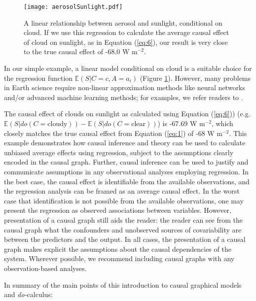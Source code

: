 \documentclass[12pt]{article}
\begin{document}
\begin{figure} \centering \texttt{[image: aerosolSunlight.pdf]}
  \caption{A linear relationship between aerosol and sunlight,
    conditional on cloud. If we use this regression to calculate the
    average causal effect of cloud on sunlight, as in Equation
    (\ref{eq:6}), our result is very close to the true causal effect
    of -68.0 W m$^{-2}$.}
  \label{fig:linear}
\end{figure}

In our simple example, a linear model conditional on cloud is a
suitable choice for the regression function
$\mathbb{E}(S | C=c, A=a_i)$ (Figure \ref{fig:linear}). However, many
problems in Earth science require non-linear approximation methods
like neural networks and/or advanced machine learning methods; for
examples, we refer readers to \citep{bishop2006pattern}.

The causal effect of clouds on sunlight as calculated using Equation
(\ref{eq:6})) (e.g.
$\mathbb{E}(S | do(C = \text{cloudy})) - \mathbb{E}(S | do(C =
\text{clear}))$) is -67.69 W m$^{-2}$, which closely matches the true
causal effect from Equation (\ref{eq:1}) of -68 W m$^{-2}$. This
example demonstrates how causal inference and theory can be used to
calculate unbiased average effects using regression, subject to the
assumptions clearly encoded in the causal graph. Further, causal
inference can be used to justify and communicate assumptions in any
observational analyses employing regression. In the best case, the
causal effect is identifiable from the available observations, and the
regression analysis can be framed as an average causal effect. In the
worst case that identification is not possible from the available
observations, one may present the regression as observed associations
between variables. However, presentation of a causal graph still aids
the reader: the reader can see from the causal graph what the
confounders and unobserved sources of covariability are between the
predictors and the output. In all cases, the presentation of a causal
graph makes explicit the assumptions about the causal dependencies of
the system. Wherever possible, we recommend including causal graphs
with any observation-based analyses.

In summary of the main points of this introduction to causal graphical
models and \textit{do-}calculus:
\end{document}
